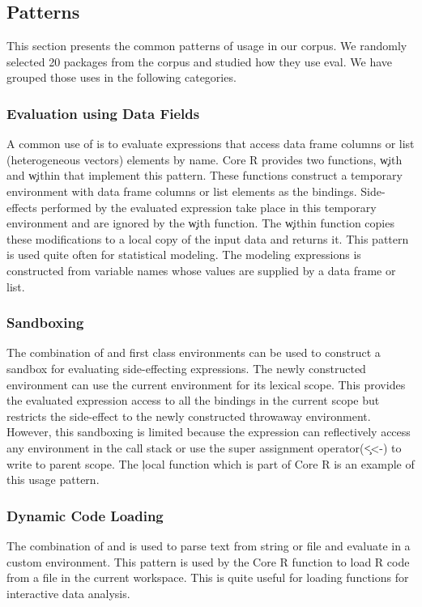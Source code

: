 \documentclass[conference]{IEEEtran}
\begin{document}
\subsection{Patterns}

This section presents the common patterns of \eval usage in our corpus. We
randomly selected 20 packages from the corpus and studied how they use eval.
We have grouped those uses in the following categories.

  \subsubsection{Evaluation using Data Fields} A common use of \eval is to
  evaluate expressions that access data frame columns or list (heterogeneous
  vectors) elements by name. Core R provides two functions, \c{with} and
  \c{within} that implement this pattern. These functions construct a temporary
  environment with data frame columns or list elements as the bindings.
  Side-effects performed by the evaluated expression take place in this temporary
  environment and are ignored by the \c{with} function. The \c{within} function
  copies these modifications to a local copy of the input data and returns it.
  This pattern is used quite often for statistical modeling. The modeling
  expressions is constructed from variable names whose values are supplied by a
  data frame or list.

  \subsubsection{Sandboxing} The combination of \eval and first class
  environments can be used to construct a sandbox for evaluating side-effecting
  expressions. The newly constructed environment can use the current environment
  for its lexical scope. This provides the evaluated expression access to all the
  bindings in the current scope but restricts the side-effect to the newly
  constructed throwaway environment. However, this sandboxing is limited because
  the expression can reflectively access any environment in the call stack or use
  the super assignment operator(\c{<<-}) to write to parent scope. The \c{local}
  function which is part of Core R is an example of this usage pattern.

  \subsubsection{Dynamic Code Loading} The combination of \parse and \eval is
  used to parse text from string or file and evaluate in a custom environment.
  This pattern is used by the \source Core R function to load R code from a file
  in the current workspace. This is quite useful for loading functions for
  interactive data analysis.
\end{document}
